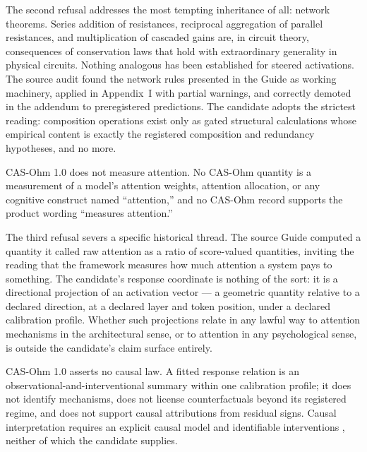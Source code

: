 The second refusal addresses the most tempting inheritance of all: network theorems. Series addition of resistances, reciprocal aggregation of parallel resistances, and multiplication of cascaded gains are, in circuit theory, consequences of conservation laws that hold with extraordinary generality in physical circuits. Nothing analogous has been established for steered activations. The source audit found the network rules presented in the Guide as working machinery, applied in Appendix~I with partial warnings, and correctly demoted in the addendum to preregistered predictions. The candidate adopts the strictest reading: composition operations exist only as gated structural calculations whose empirical content is exactly the registered composition and redundancy hypotheses, and no more.

\begin{boundary}\label{ch01:bd:attention}
CAS-Ohm 1.0 does not measure attention. No CAS-Ohm quantity is a measurement of a model's attention weights, attention allocation, or any cognitive construct named ``attention,'' and no CAS-Ohm record supports the product wording ``measures attention.''
\end{boundary}

The third refusal severs a specific historical thread. The source Guide computed a quantity it called raw attention as a ratio of score-valued quantities, inviting the reading that the framework measures how much attention a system pays to something. The candidate's response coordinate is nothing of the sort: it is a directional projection of an activation vector --- a geometric quantity relative to a declared direction, at a declared layer and token position, under a declared calibration profile. Whether such projections relate in any lawful way to attention mechanisms in the architectural sense, or to attention in any psychological sense, is outside the candidate's claim surface entirely.

\begin{boundary}\label{ch01:bd:causal}
CAS-Ohm 1.0 asserts no causal law. A fitted response relation is an observational-and-interventional summary within one calibration profile; it does not identify mechanisms, does not license counterfactuals beyond its registered regime, and does not support causal attributions from residual signs. Causal interpretation requires an explicit causal model and identifiable interventions \cite{pearl}, neither of which the candidate supplies.
\end{boundary}

